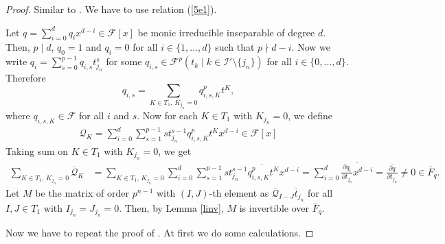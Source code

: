 \documentclass[times,10pt]{amsart}
\newcommand{\F}{\ensuremath{\mathcal{F}}}
\newcommand{\I}{\ensuremath{\mathcal{I}}}
\begin{document}
\begin{proof}
          Similar to \cite[Proposition 3.9, (2)]{ex}. We  have to use    relation (\ref{5e1}).
        
 Let $q= \sum_{i=0}^{d}q_i x^{d-i}\in \F[x]$ be  monic irreducible  inseparable of degree $d$. Then,  $p\mid d$, $q_0=1$ and $q_i=0$ for all $i\in \{1,\ldots,d\}$ such that {$p\nmid d-i$}.   Now we write  $\displaystyle{q_i=\sum_{s=0}^{p-1} q_{i,s} t_{j_n}^s } $ for some $q_{i,s}\in \F^p( t_k\mid {k\in \I'\setminus\{j_n\}})$ for all $i\in \{0,\ldots,d\}$. Therefore$$ q_{i,s}= \sum_{K\in T_1,\, K_{j_n}=0} q_{i,s,K}^p t^K,$$ where $q_{i,s,K}\in \F$ for all $i$ and $s$. Now for each $K\in T_1$ with $K_{j_n}=0$, we define \begin{align}\label{sd2} {\mathcal{Q}_K= \sum_{i=0}^{d}\sum_{s=1}^{p-1} {  s t_{j_n}^{s-1} q^p_{i,s,K}t^K x^{d-i}}\in \F[x]}\end{align} Taking sum on $K\in T_1$ with $K_{j_n}=0$, we get \begin{align*}
     { \sum_{K\in T_1,\,K_{j_n}=0}\overline{\mathcal{Q}}_K}&=\sum_{K\in T_1,\, K_{j_n}=0}\sum_{i=0}^{d}\sum_{s=1}^{p-1} \overline{  s t_{j_n}^{s-1} q^p_{i,s,K} t^Kx^{d-i}}= \sum_{i=0}^{d} \overline{\frac{\partial q_i}{\partial t_{j_n}} x^{d-i}}= \overline{ \frac{\partial q}{\partial t_{j_n}}}\neq 0\in \overline{F}_q.
 \end{align*} Let $M$ be the matrix  of order $p^{n-1}$ with $(I,J)$-th element as {$\overline{\mathcal{Q}}_{I-J}\overline{t}_{j_n}$} for all $I,J\in T_1$ with $I_{j_n}=J_{j_n}=0$. Then, by Lemma \ref{linv}, $M$ is invertible over $\overline{F}_q$.  
 
  Now we have to repeat the proof of \cite[Proposition 3.9, (3)]{ex}. At first we do some calculations.
  

\end{proof}
\end{document}
